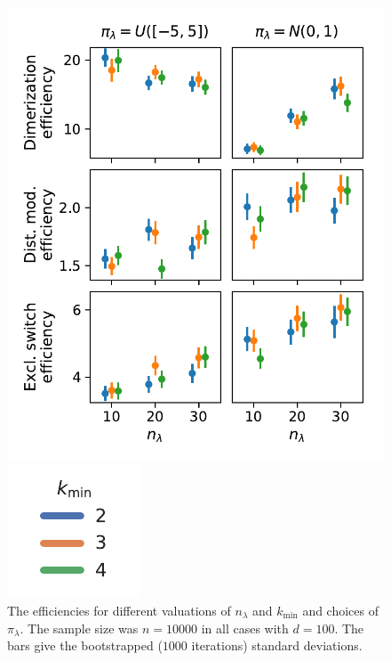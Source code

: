 \begin{figure}[htb]
    \centering
    \begin{minipage}{0.6\textwidth}
        \vfill
    \includegraphics[scale=.5]{gfx/efficiency_priors.pdf}
    \vfill
    \end{minipage}
    \begin{minipage}{0.2\textwidth}
        \vfill
    \includegraphics[scale=.7]{gfx/legend.pdf}
        \vfill
    \end{minipage}
	\caption[Estimates for varying ${n}_{\lambda}$ and ${k}_{\min}$]{The efficiencies for different valuations of ${n}_{\lambda}$ and ${k}_{\min} $
	and choices of ${\pi}_{\lambda}$. The sample size was $n=\num{10000}$ in all cases
    with $d=100$.
    The bars give the bootstrapped ($1000$ iterations) standard deviations.\label{fig:efficiencies_prior}}
\end{figure}

